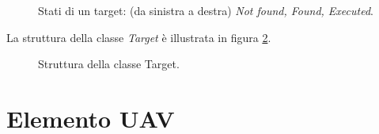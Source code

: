 \begin{figure}[H] 
    \captionsetup{justification=centering, margin=2cm, font=footnotesize}
    \begin{center}
    \end{center}
    \caption{Stati di un target: (da sinistra a destra) \textit{Not found, Found, Executed}.}
    \label{tipi_target}
\end{figure}

La struttura della classe \textit{Target} è illustrata in figura \ref{classe_target}.
\begin{figure}[H] 
    \captionsetup{justification=centering, margin=2cm, font=footnotesize}
    \begin{center}
    \end{center}
    \caption{Struttura della classe Target.}
    \label{classe_target}
\end{figure}

\section {Elemento UAV}

